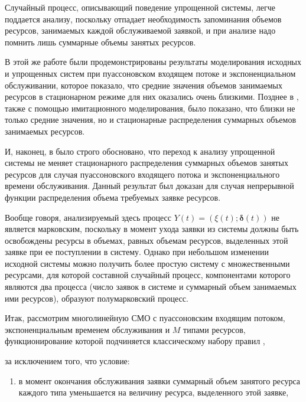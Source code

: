 \documentclass[a4paper,12pt]{article}
\begin{document}

Случайный процесс, описывающий поведение упрощенной системы, легче поддается анализу, поскольку отпадает необходимость запоминания объемов ресурсов, занимаемых каждой обслуживаемой заявкой, и при анализе надо помнить лишь суммарные объемы занятых ресурсов.

В этой же работе были продемонстрированы результаты моделирования исходных и упрощенных систем при пуассоновском входящем потоке и экспоненциальном обслуживании, которое показало,  что средние значения объемов занимаемых ресурсов в стационарном режиме для них оказались очень близкими. Позднее в \cite{Naumov_2_2014}, также с помощью имитационного моделирования, было показано, что близки не только средние значения, но и стационарные распределения суммарных объемов занимаемых ресурсов.



И, наконец, в \cite{Naumov_3_2016} было строго обосновано, что переход к анализу упрощенной системы не меняет стационарного распределения суммарных объемов занятых ресурсов для случая пуассоновского входящего потока и экспоненциального времени обслуживания. Данный результат был доказан для случая непрерывной функции распределения объема требуемых заявке ресурсов.

Вообще говоря, анализируемый здесь процесс $Y(t)=(\xi(t);\boldsymbol{\delta}(t))$ не является марковским, поскольку в момент ухода заявки из системы должны быть освобождены ресурсы в объемах, равных объемам ресурсов, выделенных этой заявке при ее поступлении в систему. Однако при небольшом изменении исходной системы можно получить более простую систему с множественными ресурсами, для которой составной случайный процесс, компонентами которого являются два процесса (число заявок в системе и суммарный объем занимаемых ими ресурсов), образуют полумарковский процесс.

Итак, рассмотрим многолинейную СМО с пуассоновским входящим потоком, экспоненциальным временем обслуживания и $M$ типами ресурсов, функционирование которой подчиняется классическому набору правил \cite{Ch_1},

за исключением того, что условие:

\begin{enumerate}

\item[] в момент окончания обслуживания заявки суммарный объем занятого ресурса каждого типа уменьшается на величину ресурса, выделенного этой заявке,

\end{enumerate}
\end{document}

